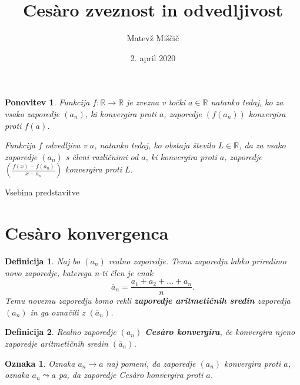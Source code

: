\documentclass{beamer}
\title{Ces\`{a}ro zveznost in odvedljivost}
\author{Matevž Miščič}
\date{2. april 2020}
\newtheorem{definicija}{Definicija}
\newtheorem{ponovitev}{Ponovitev}
\newtheorem{oznaka}{Oznaka}
\begin{document}
    
\begin{frame}
    \titlepage
\end{frame}

\begin{frame}
    \begin{ponovitev}
        Funkcija $f: \mathbb{R} \rightarrow \mathbb{R}$ je zvezna v točki $a \in \mathbb{R}$ natanko tedaj, ko za vsako zaporedje $(a_n)$, ki konvergira proti $a$, zaporedje $(f(a_n))$ konvergira proti $f(a)$.
        \pause
        
        \medskip
        Funkcija $f$ odvedljiva v $a$, natanko tedaj, ko obstaja število $L \in \mathbb{R}$, da za vsako zaporedje $(a_n)$ s členi različnimi od $a$, ki konvergira proti $a$, zaporedje $(\frac{f(x)-f(a_n)}{x-a_n})$ konvergira proti $L$.
    \end{ponovitev}
\end{frame}

\begin{frame}{Vsebina predstavitve}
    \tableofcontents
\end{frame}



\section{Ces\`{a}ro konvergenca}

\begin{frame}
    \begin{definicija}
        Naj bo $(a_n)$ realno zaporedje. Temu zaporedju lahko priredimo novo zaporedje, katerega n-ti člen je enak 
        $$\overline{a}_n = \frac{a_1+a_2+\ldots+a_n}{n}.$$ 
        Temu novemu zaporedju bomo rekli \textbf{zaporedje aritmetičnih sredin} zaporedja $(a_n)$ in ga označili z $(\overline{a}_n)$.
    \end{definicija}
    \pause
    \begin{definicija}
        Realno zaporedje $(a_n)$ \textbf{Ces\`{a}ro konvergira}, če konvergira njeno zaporedje aritmetičnih sredin $(\overline{a}_n)$.
    \end{definicija}
    \pause
    \begin{oznaka}
        Oznaka $a_n \rightarrow a$ naj pomeni, da zaporedje $(a_n)$ konvergira proti $a$, oznaka $a_n \leadsto a$ pa, da zaporedje Ces\`{a}ro konvergira proti $a$. 
    \end{oznaka}
\end{frame}
\end{document}
